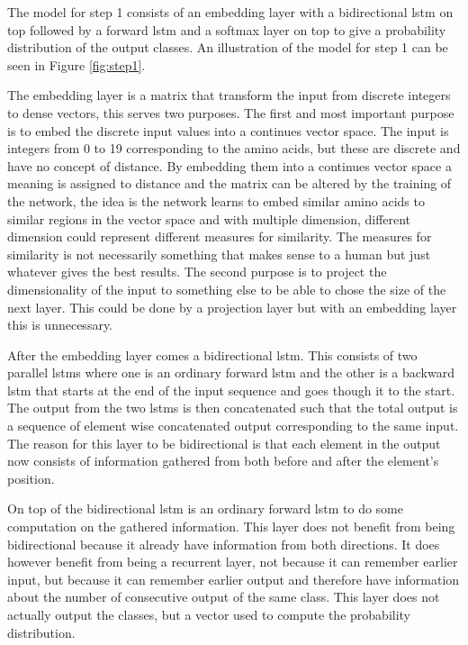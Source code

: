 The model for step 1 consists of an embedding layer with a bidirectional \gls{lstm} on top followed by a
forward \gls{lstm} and a softmax layer on top to give a probability distribution of the output classes.
An illustration of the model for step 1 can be seen in Figure \ref{fig:step1}.

The embedding layer is a matrix that transform the input from discrete integers to dense vectors, 
this serves two purposes. The first and most important purpose is to embed the discrete input values 
into a continues vector space. The input is integers from 0 to 19 corresponding to the amino acids, but 
these are discrete and have no concept of distance. By embedding them into a continues vector space 
a meaning is assigned to distance and the matrix can be altered by the training of the network, 
the idea is the network learns to embed similar amino acids to similar regions in the vector space
and with multiple dimension, different dimension could represent different measures for similarity. 
The measures for similarity is not necessarily something that makes sense to a human but just whatever 
gives the best results. The second purpose is to project the dimensionality of the input to something else 
to be able to chose the size of the next layer. This could be done by a projection layer but with an embedding 
layer this is unnecessary. 

After the embedding layer comes a bidirectional \gls{lstm}. This consists of two parallel \glspl{lstm} where 
one is an ordinary forward \gls{lstm} and the other is a backward \gls{lstm} that starts at the end of the 
input sequence and goes though it to the start. The output from the two \glspl{lstm} is then concatenated
such that the total output is a sequence of element wise concatenated output corresponding to the same input.
The reason for this layer to be bidirectional is that each element in the output now consists of information
gathered from both before and after the element's position. 

On top of the bidirectional \gls{lstm} is an ordinary forward \gls{lstm} to do some computation on the
gathered information. This layer does not benefit from being bidirectional because it already have 
information from both directions. It does however benefit from being a recurrent layer, not 
because it can remember earlier input, but because it can remember earlier output and therefore have
information about the number of consecutive output of the same class. This layer does not actually 
output the classes, but a vector used to compute the probability distribution.

